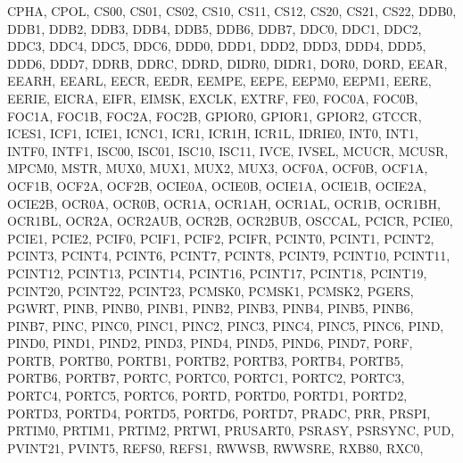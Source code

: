 {{                CPHA, CPOL, CS00, CS01, CS02, CS10, CS11, CS12,
                CS20, CS21, CS22,
                DDB0, DDB1, DDB2, DDB3, DDB4, DDB5, DDB6, DDB7,
                DDC0, DDC1, DDC2, DDC3, DDC4, DDC5, DDC6,
                DDD0, DDD1, DDD2, DDD3, DDD4, DDD5, DDD6, DDD7,
                DDRB, DDRC, DDRD, DIDR0, DIDR1, DOR0, DORD,
                EEAR, EEARH, EEARL, EECR, EEDR, EEMPE, EEPE,
                EEPM0, EEPM1, EERE, EERIE, EICRA, EIFR, EIMSK,
                EXCLK, EXTRF, FE0,
                FOC0A, FOC0B, FOC1A, FOC1B, FOC2A, FOC2B,
                GPIOR0, GPIOR1, GPIOR2, GTCCR,
                ICES1, ICF1, ICIE1, ICNC1, ICR1, ICR1H, ICR1L,
                IDRIE0, INT0, INT1, INTF0, INTF1, ISC00, ISC01,
                ISC10, ISC11, IVCE, IVSEL,
                MCUCR, MCUSR, MPCM0, MSTR, MUX0, MUX1, MUX2,
                MUX3,
                OCF0A, OCF0B, OCF1A, OCF1B, OCF2A, OCF2B,
                OCIE0A, OCIE0B, OCIE1A, OCIE1B, OCIE2A, OCIE2B,
                OCR0A, OCR0B, OCR1A, OCR1AH, OCR1AL, OCR1B,
                OCR1BH, OCR1BL, OCR2A, OCR2AUB, OCR2B, OCR2BUB,
                OSCCAL,
                PCICR, PCIE0, PCIE1, PCIE2, PCIF0, PCIF1,
                PCIF2, PCIFR,
                PCINT0, PCINT1, PCINT2, PCINT3, PCINT4, PCINT6,
                PCINT7, PCINT8, PCINT9, PCINT10, PCINT11,
                PCINT12, PCINT13, PCINT14, PCINT16, PCINT17,
                PCINT18, PCINT19, PCINT20, PCINT22, PCINT23,
                PCMSK0, PCMSK1, PCMSK2, PGERS, PGWRT,
                PINB,
                PINB0, PINB1, PINB2, PINB3, PINB4, PINB5, PINB6,
                PINB7,
                PINC,
                PINC0, PINC1, PINC2, PINC3, PINC4, PINC5, PINC6,
                PIND,
                PIND0, PIND1, PIND2, PIND3, PIND4, PIND5, PIND6,
                PIND7,
                PORF,
                PORTB,
                PORTB0, PORTB1, PORTB2, PORTB3, PORTB4, PORTB5,
                PORTB6, PORTB7,
                PORTC,
                PORTC0, PORTC1, PORTC2, PORTC3, PORTC4, PORTC5,
                PORTC6,
                PORTD,
                PORTD0, PORTD1, PORTD2, PORTD3, PORTD4, PORTD5,
                PORTD6, PORTD7,
                PRADC, PRR, PRSPI, PRTIM0, PRTIM1, PRTIM2,
                PRTWI, PRUSART0, PSRASY, PSRSYNC, PUD, PVINT21,
                PVINT5,
                REFS0, REFS1, RWWSB, RWWSRE, RXB80, RXC0,
}}
